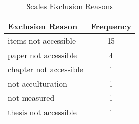 \begin{table}
\begin{minipage}[t][\textheight][t]{\textwidth}

\caption{\label{tab:ScalesExclusion}Scales Exclusion Reasons}
\begin{tabular}[t]{lc}
\toprule
Exclusion Reason & Frequency\\
\midrule
items not accessible & 15\\
paper not accessible & 4\\
chapter not accessible & 1\\
not acculturation & 1\\
not measured & 1\\
thesis not accessible & 1\\
\bottomrule
\end{tabular}
\end{minipage}
\end{table}
